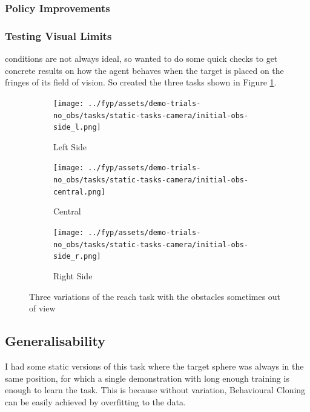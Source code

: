 \subsubsection{Policy Improvements}



\subsubsection{Testing Visual Limits}


conditions are not always ideal, so wanted to do some quick checks to get concrete results on how the agent behaves when the target is placed on the fringes of its field of vision. So created the three tasks shown in Figure \ref{fig:no-obs-3-views}.

\begin{figure}[htbp]
  \begin{subfigure}{0.3\linewidth}
    \centering
    \texttt{[image: ../fyp/assets/demo-trials-no\_obs/tasks/static-tasks-camera/initial-obs-side\_l.png]}      
    \caption{Left Side}
  \end{subfigure}
  \hfill
  \begin{subfigure}{0.3\textwidth}
    \centering
    \texttt{[image: ../fyp/assets/demo-trials-no\_obs/tasks/static-tasks-camera/initial-obs-central.png]}
    \caption{Central}
  \end{subfigure}
  \hfill
  \begin{subfigure}{0.3\linewidth}
    \centering
    \texttt{[image: ../fyp/assets/demo-trials-no\_obs/tasks/static-tasks-camera/initial-obs-side\_r.png]}
    \caption{Right Side}
  \end{subfigure}%
  \caption{Three variations of the reach task with the obstacles sometimes out of view}\label{fig:no-obs-3-views}
\end{figure}

\subsection{Generalisability}
I had some static versions of this task where the target sphere was always in the same position, for which a single demonstration with long enough training is enough to learn the task. This is because without variation, Behavioural Cloning can be easily achieved by overfitting to the data. 

